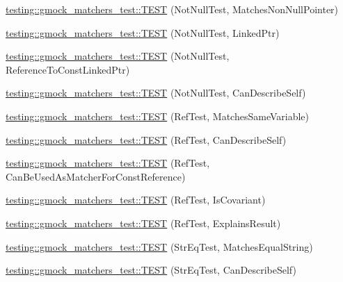 \begin{DoxyCompactItemize}
\item 
\mbox{\hyperlink{namespacetesting_1_1gmock__matchers__test_a694ea33511eab7822b88d8e74b388534}{testing\+::gmock\+\_\+matchers\+\_\+test\+::\+T\+E\+ST}} (Not\+Null\+Test, Matches\+Non\+Null\+Pointer)
\item 
\mbox{\hyperlink{namespacetesting_1_1gmock__matchers__test_aec956599ef91df968fec972247c7a28a}{testing\+::gmock\+\_\+matchers\+\_\+test\+::\+T\+E\+ST}} (Not\+Null\+Test, Linked\+Ptr)
\item 
\mbox{\hyperlink{namespacetesting_1_1gmock__matchers__test_a9e9560feb52f60475f653c15cc7466aa}{testing\+::gmock\+\_\+matchers\+\_\+test\+::\+T\+E\+ST}} (Not\+Null\+Test, Reference\+To\+Const\+Linked\+Ptr)
\item 
\mbox{\hyperlink{namespacetesting_1_1gmock__matchers__test_a68da7653e6a480c60a3a03fe8afb20fc}{testing\+::gmock\+\_\+matchers\+\_\+test\+::\+T\+E\+ST}} (Not\+Null\+Test, Can\+Describe\+Self)
\item 
\mbox{\hyperlink{namespacetesting_1_1gmock__matchers__test_a199983108927dadee9bd2e03ddd6057d}{testing\+::gmock\+\_\+matchers\+\_\+test\+::\+T\+E\+ST}} (Ref\+Test, Matches\+Same\+Variable)
\item 
\mbox{\hyperlink{namespacetesting_1_1gmock__matchers__test_ad8fc5a82cbb4b5b8147798be06d7059b}{testing\+::gmock\+\_\+matchers\+\_\+test\+::\+T\+E\+ST}} (Ref\+Test, Can\+Describe\+Self)
\item 
\mbox{\hyperlink{namespacetesting_1_1gmock__matchers__test_af1e64d057f2c46cc17f1c96a075cde6b}{testing\+::gmock\+\_\+matchers\+\_\+test\+::\+T\+E\+ST}} (Ref\+Test, Can\+Be\+Used\+As\+Matcher\+For\+Const\+Reference)
\item 
\mbox{\hyperlink{namespacetesting_1_1gmock__matchers__test_a03b45cf0f65f33208ac378b8603ff67a}{testing\+::gmock\+\_\+matchers\+\_\+test\+::\+T\+E\+ST}} (Ref\+Test, Is\+Covariant)
\item 
\mbox{\hyperlink{namespacetesting_1_1gmock__matchers__test_ab73595bcf8dd511b519b640248136ccd}{testing\+::gmock\+\_\+matchers\+\_\+test\+::\+T\+E\+ST}} (Ref\+Test, Explains\+Result)
\item 
\mbox{\hyperlink{namespacetesting_1_1gmock__matchers__test_a5956b46686ad29d2d29b313bce9eba8a}{testing\+::gmock\+\_\+matchers\+\_\+test\+::\+T\+E\+ST}} (Str\+Eq\+Test, Matches\+Equal\+String)
\item 
\mbox{\hyperlink{namespacetesting_1_1gmock__matchers__test_a1cb9d74bdf937816807e91b842b22c75}{testing\+::gmock\+\_\+matchers\+\_\+test\+::\+T\+E\+ST}} (Str\+Eq\+Test, Can\+Describe\+Self)

\end{DoxyCompactItemize}
